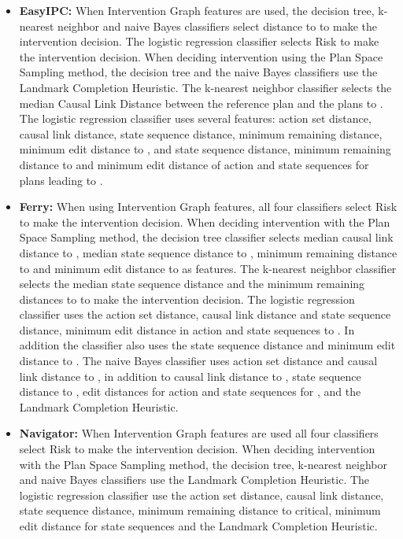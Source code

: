 \begin{itemize}
\item \textbf{EasyIPC:}
When Intervention Graph features are used, the decision tree, k-nearest neighbor and naive Bayes classifiers select distance to \undesired to make the intervention decision.
The logistic regression classifier selects Risk to make the intervention decision.
When deciding intervention using the Plan Space Sampling method, the decision tree and the naive Bayes classifiers use the Landmark Completion Heuristic.
The k-nearest neighbor classifier selects the median Causal Link Distance between the reference plan and the plans to \undesired.
The logistic regression classifier uses several features: action set distance, causal link distance, state sequence distance, minimum remaining distance, minimum edit distance to \undesired, and state sequence distance, minimum remaining distance to and minimum edit distance of action and state sequences for plans leading to \desired.
\item \textbf{Ferry:} When using Intervention Graph features, all four classifiers select Risk to make the intervention decision.
When deciding intervention with the Plan Space Sampling method, the decision tree classifier selects median causal link distance to \undesired, median state sequence distance to \undesired, minimum remaining distance to \desired and minimum edit distance to \desired as features.
The k-nearest neighbor classifier selects the median state sequence distance and the minimum remaining distances to \undesired to make the intervention decision.
The logistic regression classifier uses the action set distance, causal link distance and state sequence distance, minimum edit distance in action and state sequences to \undesired. 
In addition the classifier also uses the state sequence distance and minimum edit distance to \desired.
The naive Bayes classifier uses action set distance and causal link distance to \desired, in addition to causal link distance to \undesired, state sequence distance to \undesired,  edit distances for action and state sequences for \undesired, and the Landmark Completion Heuristic.
\item \textbf{Navigator:}
When Intervention Graph features are used all four classifiers select Risk to make the intervention decision.
When deciding intervention with the Plan Space Sampling method, the decision tree, k-nearest neighbor and naive Bayes classifiers use the Landmark Completion Heuristic.
The logistic regression classifier use the action set distance, causal link distance, state sequence distance, minimum remaining distance to critical, minimum edit distance for state sequences and the Landmark Completion Heuristic.
\end{itemize}


